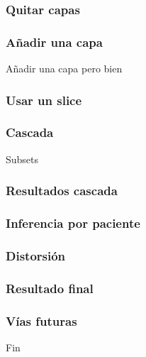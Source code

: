 \documentclass{beamer}
\begin{document}
\begin{frame}
\frametitle{Quitar capas}

\end{frame}



\begin{frame}
\frametitle{Añadir una capa}
Añadir una capa pero bien

\end{frame}



\begin{frame}
\frametitle{Usar un slice}

\end{frame}



\begin{frame}
\frametitle{Cascada}
Subsets

\end{frame}



\begin{frame}
\frametitle{Resultados cascada}

\end{frame}



\begin{frame}
\frametitle{Inferencia por paciente}

\end{frame}



\begin{frame}
\frametitle{Distorsión}

\end{frame}



\begin{frame}
\frametitle{Resultado final}

\end{frame}



\begin{frame}
\frametitle{Vías futuras}

\end{frame}



\begin{frame}
\Huge{\centerline{Fin}}
\end{frame}
\end{document}
